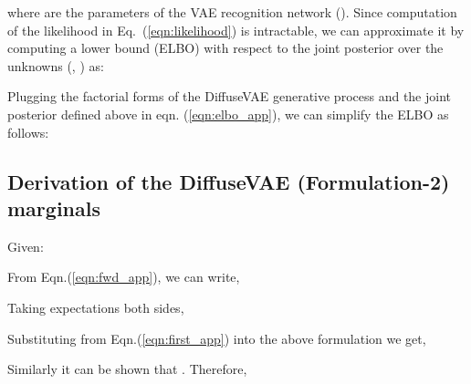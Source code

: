 \documentclass[10pt]{article} \usepackage[accepted]{tmlr}
\begin{document}
where  are the parameters of the VAE recognition network (). Since computation of the likelihood in Eq.~(\ref{eqn:likelihood}) is intractable, we can approximate it by computing a lower bound (ELBO) with respect to the joint posterior over the unknowns (, ) as:


Plugging the factorial forms of the DiffuseVAE generative process and the joint posterior defined above in eqn. (\ref{eqn:elbo_app}), we can simplify the ELBO as follows:



\subsection{Derivation of the DiffuseVAE (Formulation-2) marginals}
\label{subsec:appendix_c_2}
\noindent Given:


From Eqn.(\ref{eqn:fwd_app}), we can write,

Taking expectations both sides,

Substituting  from Eqn.(\ref{eqn:first_app}) into the above formulation we get,


\noindent Similarly it can be shown that . Therefore,

\newpage
\end{document}
